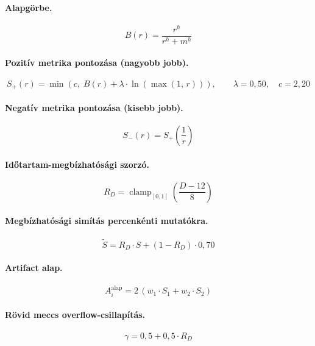 \paragraph{Alapgörbe.}
\begin{equation}
B(r) = \frac{r^h}{r^h + m^h}
\end{equation}

\paragraph{Pozitív metrika pontozása (nagyobb jobb).}
\begin{equation}
S_+(r) = \min\!\left(c,\; B(r) + \lambda \cdot \ln\!\left(\max(1,\, r)\right)\right), \qquad \lambda = 0{,}50,\quad c = 2{,}20
\end{equation}

\paragraph{Negatív metrika pontozása (kisebb jobb).}
\begin{equation}
S_-(r) = S_+\!\left(\frac{1}{r}\right)
\end{equation}

\paragraph{Időtartam-megbízhatósági szorzó.}
\begin{equation}
R_D = \operatorname{clamp}_{[0,1]}\!\left(\frac{D - 12}{8}\right)
\end{equation}

\paragraph{Megbízhatósági simítás percenkénti mutatókra.}
\begin{equation}
\tilde{S} = R_D \cdot S + (1 - R_D) \cdot 0{,}70
\end{equation}

\paragraph{Artifact alap.}
\begin{equation}
A_i^{\text{alap}} = 2\,(w_1 \cdot S_1 + w_2 \cdot S_2)
\end{equation}

\paragraph{Rövid meccs overflow-csillapítás.}
\begin{equation}
\gamma = 0{,}5 + 0{,}5 \cdot R_D
\end{equation}

